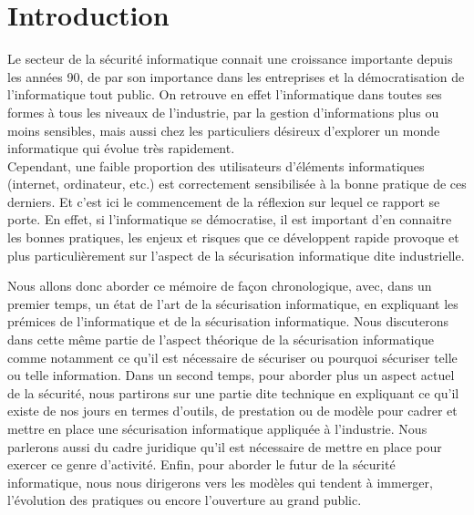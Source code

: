 \documentclass[a4paper]{memoir}
\begin{document}
\cleardoublepage
\tableofcontents*


\mainmatter%


\chapter*{Introduction}

Le secteur de la sécurité informatique connait une croissance importante depuis les années 90, de par son importance dans les entreprises et la démocratisation de l'informatique tout public. On retrouve en effet l'informatique dans toutes ses formes à tous les niveaux de l'industrie, par la gestion d'informations plus ou moins sensibles, mais aussi chez les particuliers désireux d'explorer un monde informatique qui évolue très rapidement.\\

Cependant, une faible proportion des utilisateurs d'éléments informatiques (internet, ordinateur, etc.) est correctement sensibilisée à la bonne pratique de ces derniers. Et c'est ici le commencement de la réflexion sur lequel ce rapport se porte. En effet, si l'informatique se démocratise, il est important d'en connaitre les bonnes pratiques, les enjeux et risques que ce développent rapide provoque et plus particulièrement sur l'aspect de la sécurisation informatique dite industrielle.

Nous allons donc aborder ce mémoire de façon chronologique, avec, dans un premier temps, un état de l'art de la sécurisation informatique, en expliquant les prémices de l'informatique et de la sécurisation informatique. Nous discuterons dans cette même partie de l'aspect théorique de la sécurisation informatique comme notamment ce qu'il est nécessaire de sécuriser ou pourquoi sécuriser telle ou telle information.
Dans un second temps, pour aborder plus un aspect actuel de la sécurité, nous partirons sur une partie dite technique en expliquant ce qu'il existe de nos jours en termes d'outils, de prestation ou de modèle pour cadrer et mettre en place une sécurisation informatique appliquée à l'industrie. Nous parlerons aussi du cadre juridique qu'il est nécessaire de mettre en place pour exercer ce genre d'activité. Enfin, pour aborder le futur de la sécurité informatique, nous nous dirigerons vers les modèles qui tendent à immerger, l'évolution des pratiques ou encore l'ouverture au grand public.\\
\end{document}
